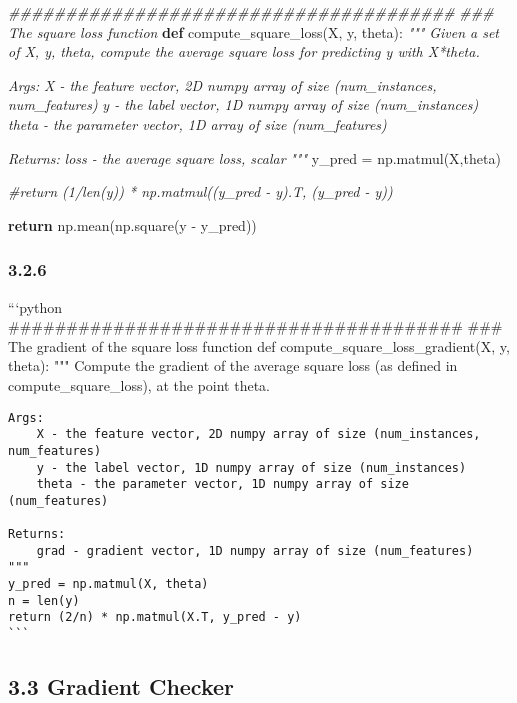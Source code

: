 \documentclass[11pt]{article}
\newenvironment{Shaded}{}{}
\newcommand{\KeywordTok}[1]{\textcolor[rgb]{0.00,0.44,0.13}{\textbf{{#1}}}}
\newcommand{\CommentTok}[1]{\textcolor[rgb]{0.38,0.63,0.69}{\textit{{#1}}}}
\newcommand{\NormalTok}[1]{{#1}}
\newcommand{\ControlFlowTok}[1]{\textcolor[rgb]{0.00,0.44,0.13}{\textbf{{#1}}}}
\newcommand{\OperatorTok}[1]{\textcolor[rgb]{0.40,0.40,0.40}{{#1}}}
\begin{document}
    \begin{Shaded}
\begin{Highlighting}[]
\CommentTok{#######################################}
\CommentTok{### The square loss function}
\KeywordTok{def}\NormalTok{ compute_square_loss(X, y, theta):}
    \CommentTok{"""}
\CommentTok{    Given a set of X, y, theta, compute the average square loss for predicting y with X*theta.}

\CommentTok{    Args:}
\CommentTok{        X - the feature vector, 2D numpy array of size (num_instances, num_features)}
\CommentTok{        y - the label vector, 1D numpy array of size (num_instances)}
\CommentTok{        theta - the parameter vector, 1D array of size (num_features)}

\CommentTok{    Returns:}
\CommentTok{        loss - the average square loss, scalar}
\CommentTok{    """}
\NormalTok{    y_pred }\OperatorTok{=}\NormalTok{ np.matmul(X,theta)}

    \CommentTok{#return (1/len(y)) * np.matmul((y_pred - y).T, (y_pred - y))}

    \ControlFlowTok{return}\NormalTok{ np.mean(np.square(y }\OperatorTok{-}\NormalTok{ y_pred))}
\end{Highlighting}
\end{Shaded}

    \subsubsection{3.2.6}\label{section}

    ```python
\#\#\#\#\#\#\#\#\#\#\#\#\#\#\#\#\#\#\#\#\#\#\#\#\#\#\#\#\#\#\#\#\#\#\#\#\#\#\#
\#\#\# The gradient of the square loss function def
compute\_square\_loss\_gradient(X, y, theta): """ Compute the gradient
of the average square loss (as defined in compute\_square\_loss), at the
point theta.

\begin{verbatim}
Args:
    X - the feature vector, 2D numpy array of size (num_instances, num_features)
    y - the label vector, 1D numpy array of size (num_instances)
    theta - the parameter vector, 1D numpy array of size (num_features)

Returns:
    grad - gradient vector, 1D numpy array of size (num_features)
"""
y_pred = np.matmul(X, theta)
n = len(y)
return (2/n) * np.matmul(X.T, y_pred - y)
```
\end{verbatim}

    \subsection{3.3 Gradient Checker}\label{gradient-checker}
\end{document}
